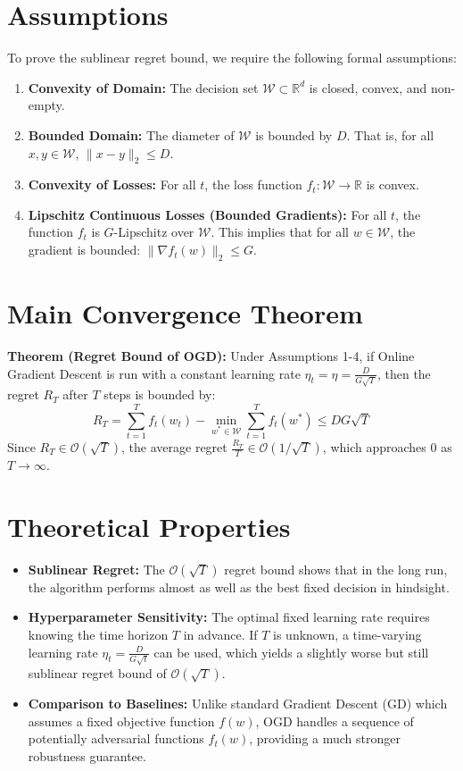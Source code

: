 \documentclass[11pt]{article}
\begin{document}
\section*{Assumptions}
To prove the sublinear regret bound, we require the following formal assumptions:
\begin{enumerate}
    \item \textbf{Convexity of Domain:} The decision set $\mathcal{W} \subset \mathbb{R}^d$ is closed, convex, and non-empty.
    \item \textbf{Bounded Domain:} The diameter of $\mathcal{W}$ is bounded by $D$. That is, for all $x, y \in \mathcal{W}$, $\|x - y\|_2 \le D$.
    \item \textbf{Convexity of Losses:} For all $t$, the loss function $f_t: \mathcal{W} \to \mathbb{R}$ is convex.
    \item \textbf{Lipschitz Continuous Losses (Bounded Gradients):} For all $t$, the function $f_t$ is $G$-Lipschitz over $\mathcal{W}$. This implies that for all $w \in \mathcal{W}$, the gradient is bounded: $\|\nabla f_t(w)\|_2 \le G$.
\end{enumerate}

\section*{Main Convergence Theorem}
\textbf{Theorem (Regret Bound of OGD):} Under Assumptions 1-4, if Online Gradient Descent is run with a constant learning rate $\eta_t = \eta = \frac{D}{G\sqrt{T}}$, then the regret $R_T$ after $T$ steps is bounded by:
$$R_T = \sum_{t=1}^T f_t(w_t) - \min_{w^* \in \mathcal{W}} \sum_{t=1}^T f_t(w^*) \le D G \sqrt{T}$$
Since $R_T \in \mathcal{O}(\sqrt{T})$, the average regret $\frac{R_T}{T} \in \mathcal{O}(1/\sqrt{T})$, which approaches $0$ as $T \to \infty$.

\section*{Theoretical Properties}
\begin{itemize}
    \item \textbf{Sublinear Regret:} The $\mathcal{O}(\sqrt{T})$ regret bound shows that in the long run, the algorithm performs almost as well as the best fixed decision in hindsight.
    \item \textbf{Hyperparameter Sensitivity:} The optimal fixed learning rate requires knowing the time horizon $T$ in advance. If $T$ is unknown, a time-varying learning rate $\eta_t = \frac{D}{G\sqrt{t}}$ can be used, which yields a slightly worse but still sublinear regret bound of $\mathcal{O}(\sqrt{T})$.
    \item \textbf{Comparison to Baselines:} Unlike standard Gradient Descent (GD) which assumes a fixed objective function $f(w)$, OGD handles a sequence of potentially adversarial functions $f_t(w)$, providing a much stronger robustness guarantee.
\end{itemize}
\end{document}
